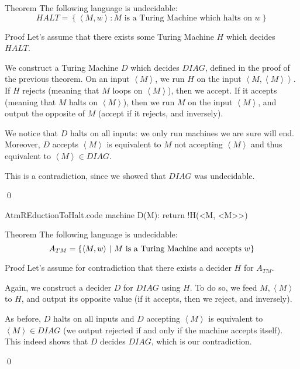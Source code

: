 \documentclass[a4paper]{article}
\begin{document}
\begin{parag}{Theorem}
    The following language is undecidable:
    \[HALT = \left\{\left\langle M, w \right\rangle : M \text{ is a Turing Machine which halts on $w$}\right\}\]

    \begin{subparag}{Proof}
        Let's assume that there exists some Turing Machine $H$ which decides $HALT$.

        We construct a Turing Machine $D$ which decides $DIAG$, defined in the proof of the previous theorem. On an input $\left\langle M \right\rangle$, we run $H$ on the input $\left\langle M, \left\langle M \right\rangle \right\rangle$. If $H$ rejects (meaning that $M$ loops on $\left\langle M \right\rangle$), then we accept. If it accepts (meaning that $M$ halts on $\left\langle M \right\rangle$), then we run $M$ on the input $\left\langle M \right\rangle$, and output the opposite of $M$ (accept if it rejects, and inversely).


        We notice that $D$ halts on all inputs: we only run machines we are sure will end. Moreover, $D$ accepts $\left\langle M \right\rangle$ is equivalent to $M$ not accepting $\left\langle M \right\rangle$ and thus equivalent to $\left\langle M \right\rangle \in DIAG$.

        This is a contradiction, since we showed that $DIAG$ was undecidable.

        \qed
    \end{subparag}
\end{parag}

\begin{filecontents*}[overwrite]{AtmREductionToHalt.code}
machine D(M):
    return !H(<M, <M>>)
\end{filecontents*}


\begin{parag}{Theorem}
    The following language is undecidable: 
    \[A_{TM} = \left\{\left\langle M, w \right\rangle \suchthat \text{$M$ is a Turing Machine and accepts $w$}\right\}\]
    
    \begin{subparag}{Proof}
        Let's assume for contradiction that there exists a decider $H$ for $A_{TM}$. 

        Again, we construct a decider $D$ for $DIAG$ using $H$. To do so, we feed $M, \left\langle M \right\rangle$ to $H$, and output its opposite value (if it accepts, then we reject, and inversely). 

        As before, $D$ halts on all inputs and $D$ accepting $\left\langle M \right\rangle$ is equivalent to $\left\langle M \right\rangle \in DIAG$ (we output rejected if and only if the machine accepts itself). This indeed shows that $D$ decides $DIAG$, which is our contradiction.

        \qed
    \end{subparag}
\end{parag}
\end{document}
